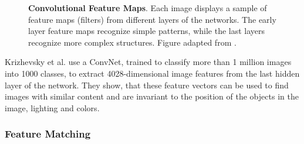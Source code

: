 \documentclass{article}
\begin{document}
\begin{figure}[h]
\centering
{}\hspace{.3cm}
\hspace{.3cm}
\caption{\label{fig:conv_feats} \textbf{Convolutional Feature Maps}. Each image displays a sample of feature maps (filters) from different layers of the networks. The early layer feature maps recognize simple patterns, while the last layers recognize more complex structures. Figure adapted from \cite{gandhi_build_2018}.}
\end{figure}


Krizhevsky et al. \cite{NIPS2012_4824} use a ConvNet, trained to classify more than 1 million images into 1000 classes, to extract 4028-dimensional image features from the last hidden layer of the network. They show, that these feature vectors can be used to find images with similar content and are invariant to the position of the objects in the image, lighting and colors.


\pagebreak
\subsubsection{Feature Matching}
\end{document}
